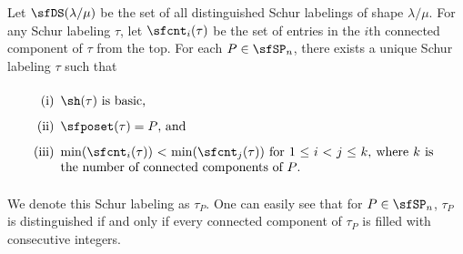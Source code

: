\documentclass[12pt, reqno]{amsart}
\theoremstyle{definition}
\numberwithin{equation}{section} \numberwithin{figure}{section}
\numberwithin{table}{section}
\begin{document}
Let $\sfDS(\lambda / \mu)$ be the set of all distinguished Schur labelings of shape $\lambda / \mu$.
For any Schur labeling $\tau$, let $\sfcnt_i(\tau)$ be the set of entries in the $i$th connected component of $\tau$ from the top.
For each $P \in \sfSP_n$, there exists a unique Schur labeling $\tau$ such that 
\begin{equation}\label{eq: def of tau_P}
\text{\parbox{.9\textwidth}{
\begin{enumerate}[label = {\rm (\roman*)}, leftmargin = 4ex]
\item $\sh(\tau)$ is basic,
\item $\sfposet(\tau) = P$, and
\item $\mathrm{min}(\sfcnt_i(\tau)) < \mathrm{min}(\sfcnt_j(\tau))$ for $1 \leq i < j \leq k$, where $k$ is the number of connected components of $P$.
\end{enumerate}
}}
\end{equation}
We denote this Schur labeling as $\tau_P$.
One can easily see that for $P \in \sfSP_n$, $\tau_P$ is distinguished if and only if every connected component of $\tau_P$ is filled with consecutive integers.
\end{document}
